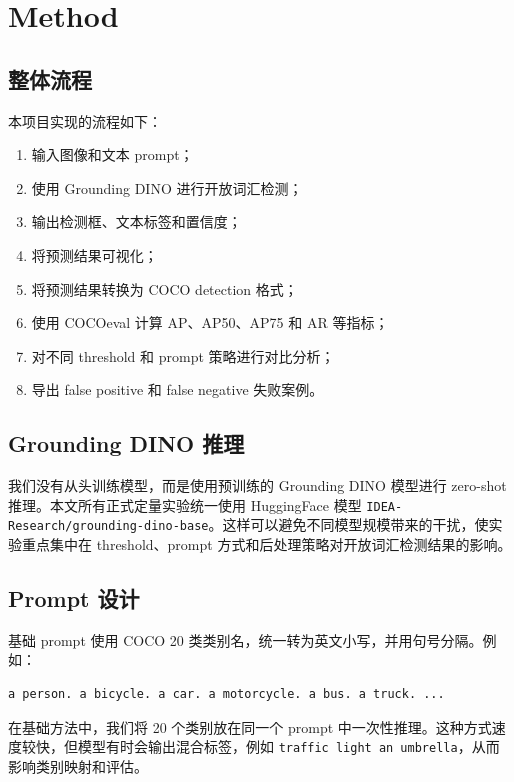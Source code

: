 \documentclass[UTF8,a4paper,11pt]{ctexart}
\begin{document}
\section{Method}

\subsection{整体流程}

本项目实现的流程如下：
\begin{enumerate}
  \item 输入图像和文本 prompt；
  \item 使用 Grounding DINO 进行开放词汇检测；
  \item 输出检测框、文本标签和置信度；
  \item 将预测结果可视化；
  \item 将预测结果转换为 COCO detection 格式；
  \item 使用 COCOeval 计算 AP、AP50、AP75 和 AR 等指标；
  \item 对不同 threshold 和 prompt 策略进行对比分析；
  \item 导出 false positive 和 false negative 失败案例。
\end{enumerate}

\subsection{Grounding DINO 推理}

我们没有从头训练模型，而是使用预训练的 Grounding DINO 模型进行 zero-shot 推理。本文所有正式定量实验统一使用 HuggingFace 模型 \texttt{IDEA-Research/grounding-dino-base}。这样可以避免不同模型规模带来的干扰，使实验重点集中在 threshold、prompt 方式和后处理策略对开放词汇检测结果的影响。

\subsection{Prompt 设计}

基础 prompt 使用 COCO 20 类类别名，统一转为英文小写，并用句号分隔。例如：

\begin{verbatim}
a person. a bicycle. a car. a motorcycle. a bus. a truck. ...
\end{verbatim}

在基础方法中，我们将 20 个类别放在同一个 prompt 中一次性推理。这种方式速度较快，但模型有时会输出混合标签，例如 \texttt{traffic light an umbrella}，从而影响类别映射和评估。
\end{document}
